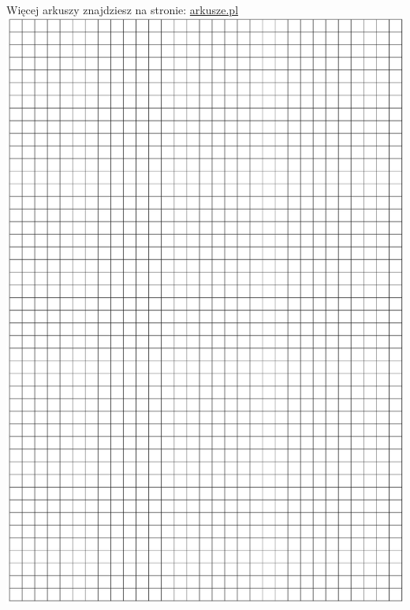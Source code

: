 \documentclass[10pt]{article}
\begin{document}
Więcej arkuszy znajdziesz na stronie: \href{http://arkusze.pl}{arkusze.pl}\\
\includegraphics[max width=\textwidth, center]{2024_11_21_72158d4a4efa7dd894bcg-07}
\end{document}

